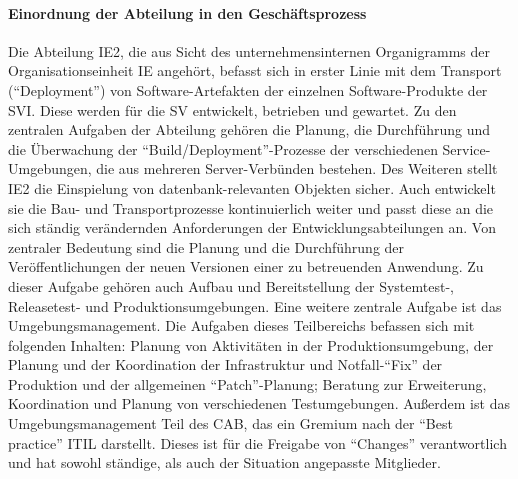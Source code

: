 \paragraph{Einordnung der Abteilung in den Geschäftsprozess}
Die Abteilung \ac{IE2}, die aus Sicht des unternehmensinternen Organigramms der Organisationseinheit \ac{IE} angehört, befasst sich in erster Linie mit dem Transport (\enquote{Deployment}) von Software-Artefakten der einzelnen Software-Produkte der \ac{SVI}. Diese werden für die \ac{SV} entwickelt, betrieben und gewartet. Zu den zentralen Aufgaben der Abteilung gehören die Planung, die Durchführung und die Überwachung der \enquote{Build/Deployment}-Prozesse der verschiedenen Service-Umgebungen, die aus mehreren Server-Verbünden bestehen. Des Weiteren stellt \ac{IE2} die Einspielung von datenbank-relevanten Objekten sicher. Auch entwickelt sie die Bau- und Transportprozesse kontinuierlich weiter und passt diese an die sich ständig verändernden Anforderungen der Entwicklungsabteilungen an. Von zentraler Bedeutung sind die Planung und die Durchführung der Veröffentlichungen der neuen Versionen einer zu betreuenden Anwendung. Zu dieser Aufgabe gehören auch Aufbau und Bereitstellung der Systemtest-, Releasetest- und Produktionsumgebungen. Eine weitere zentrale Aufgabe ist das Umgebungsmanagement. Die Aufgaben dieses Teilbereichs befassen sich mit folgenden Inhalten: Planung von Aktivitäten in der Produktionsumgebung, der Planung und der Koordination der Infrastruktur und Notfall-\enquote{Fix} der Produktion und der allgemeinen \enquote{Patch}-Planung; Beratung zur Erweiterung, Koordination und Planung von verschiedenen Testumgebungen. Außerdem ist das Umgebungsmanagement Teil des \ac{CAB}, das ein Gremium nach der \enquote{Best practice} \ac{ITIL} darstellt. Dieses ist für die Freigabe von \enquote{Changes} verantwortlich und hat sowohl ständige, als auch der Situation angepasste Mitglieder. 

